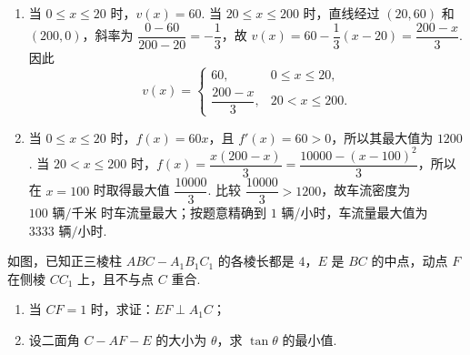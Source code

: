 \begin{solution}
\begin{enumerate}
\item 当 \(0\leqslant x\leqslant20\) 时，\(v(x)=60\). 当 \(20\leqslant x\leqslant200\) 时，直线经过 \((20,60)\) 和 \((200,0)\)，斜率为 \(\dfrac{0-60}{200-20}=-\dfrac{1}{3}\)，故 \(v(x)=60-\dfrac{1}{3}(x-20)=\dfrac{200-x}{3}\). 因此
\[
v(x)=\begin{cases}
60,&0\leqslant x\leqslant20,\\[2pt]
\dfrac{200-x}{3},&20<x\leqslant200.
\end{cases}
\]
\item 当 \(0\leqslant x\leqslant20\) 时，\(f(x)=60x\)，且 \(f'(x)=60>0\)，所以其最大值为 \(1200\). 当 \(20<x\leqslant200\) 时，\(f(x)=\dfrac{x(200-x)}{3}=\dfrac{10000-(x-100)^2}{3}\)，所以在 \(x=100\) 时取得最大值 \(\dfrac{10000}{3}\). 比较 \(\dfrac{10000}{3}>1200\)，故车流密度为 \(100\text{ 辆/千米}\) 时车流量最大；按题意精确到 \(1\) 辆/小时，车流量最大值为 \(3333\text{ 辆/小时}\).
\end{enumerate}
\end{solution}

\begin{problem}
如图，已知正三棱柱 \(ABC-A_{1}B_{1}C_{1}\) 的各棱长都是 \(4\)，\(E\) 是 \(BC\) 的中点，动点 \(F\) 在侧棱 \(CC_{1}\) 上，且不与点 \(C\) 重合.
\begin{enumerate}
\item 当 \(CF=1\) 时，求证：\(EF\perp A_{1}C\)；
\item 设二面角 \(C-AF-E\) 的大小为 \(\theta\)，求 \(\tan\theta\) 的最小值.
\end{enumerate}

\end{problem}

